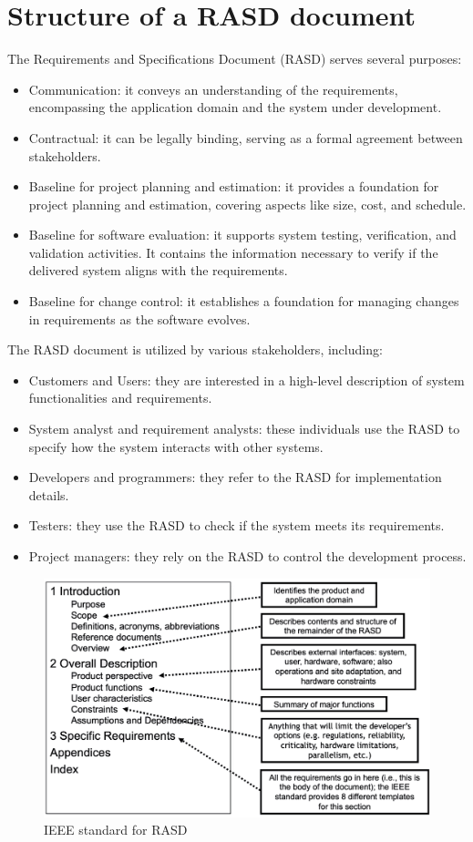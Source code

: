 \section{Structure of a RASD document}

The Requirements and Specifications Document (RASD) serves several purposes:
\begin{itemize}
    \item Communication: it conveys an understanding of the requirements, encompassing the application domain and the system under development.
    \item Contractual: it can be legally binding, serving as a formal agreement between stakeholders.
    \item Baseline for project planning and estimation: it provides a foundation for project planning and estimation, covering aspects like size, cost, and schedule.
    \item Baseline for software evaluation: it supports system testing, verification, and validation activities. 
        It contains the information necessary to verify if the delivered system aligns with the requirements.
    \item Baseline for change control: it establishes a foundation for managing changes in requirements as the software evolves.
\end{itemize}
The RASD document is utilized by various stakeholders, including:
\begin{itemize}
    \item Customers and Users: they are interested in a high-level description of system functionalities and requirements.
    \item System analyst and requirement analysts: these individuals use the RASD to specify how the system interacts with other systems.
    \item Developers and programmers: they refer to the RASD for implementation details.
    \item Testers: they use the RASD to check if the system meets its requirements.
    \item Project managers: they rely on the RASD to control the development process.
\end{itemize}
\begin{figure}[H]
    \centering
    \includegraphics[width=0.75\linewidth]{images/RASD.png}
    \caption{IEEE standard for RASD}
\end{figure}
    
